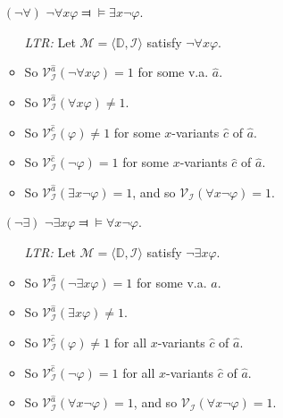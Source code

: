 \documentclass[a4paper, 11pt]{article} %
\newcommand{\tuple}[1]{\langle#1\rangle} %
\newcommand{\I}{\mathcal{I}}
\newcommand{\M}{\mathcal{M}}
\newcommand{\D}{\mathbb{D}}
\newcommand{\VV}[2]{\mathcal{V}_{#1}^{#2}} %
\begin{document}
\begin{enumerate}
  \item[$({\neg}{\forall})$] $\neg\forall x \varphi \Dashv\vDash \exists x\neg \varphi$.
    \begin{itemize}
      \item[\it LTR:] Let $\M=\tuple{\D,\I}$ satisfy $\neg\forall x \varphi$.
      \item So $\VV{\I}{\hat{a}}(\neg\forall x \varphi)=1$ for some v.a. $\hat{a}$.
      \item So $\VV{\I}{\hat{a}}(\forall x \varphi)\neq 1$.
      \item So $\VV{\I}{\hat{c}}(\varphi)\neq 1$ for some $x$-variants $\hat{c}$ of $\hat{a}$.
      \item So $\VV{\I}{\hat{c}}(\neg\varphi)=1$ for some $x$-variants $\hat{c}$ of $\hat{a}$.
      \item So $\VV{\I}{\hat{a}}(\exists x\neg\varphi)=1$, and so $\VV{\I}{}(\forall x\neg\varphi)=1$.
    \end{itemize}
  \item[$({\neg}{\exists})$] $\neg\exists x \varphi \Dashv\vDash \forall x\neg \varphi$.
    \begin{itemize}
      \item[\it LTR:] Let $\M=\tuple{\D,\I}$ satisfy $\neg\exists x \varphi$.
      \item So $\VV{\I}{\hat{a}}(\neg\exists x \varphi)=1$ for some v.a. $\hat{a}$.
      \item So $\VV{\I}{\hat{a}}(\exists x \varphi)\neq 1$.
      \item So $\VV{\I}{\hat{c}}(\varphi)\neq 1$ for all $x$-variants $\hat{c}$ of $\hat{a}$.
      \item So $\VV{\I}{\hat{c}}(\neg\varphi)=1$ for all $x$-variants $\hat{c}$ of $\hat{a}$.
      \item So $\VV{\I}{\hat{a}}(\forall x\neg\varphi)=1$, and so $\VV{\I}{}(\forall x\neg\varphi)=1$.
    \end{itemize}
\end{enumerate}
\end{document}
